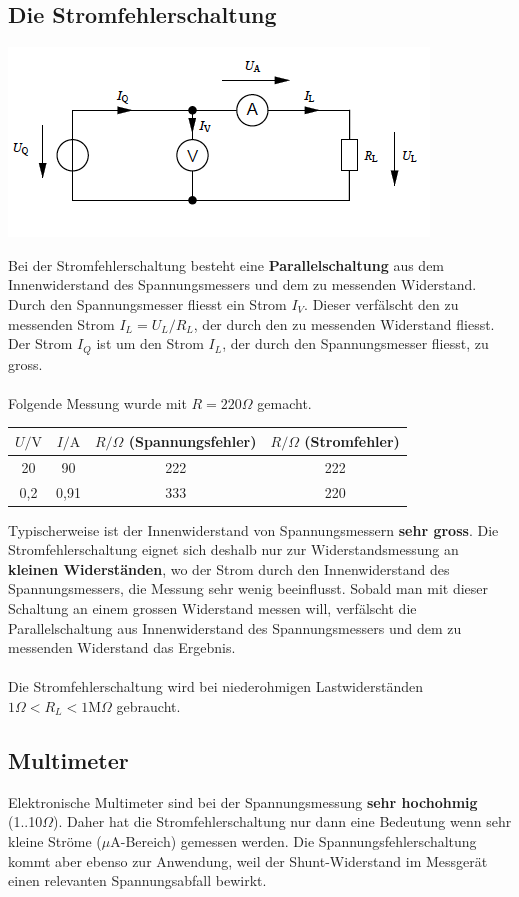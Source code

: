 \subsection{Die Stromfehlerschaltung}
\begin{center}
\includegraphics[scale=1]{../img/II/IIc}
\end{center}
Bei der Stromfehlerschaltung besteht eine \textbf{Parallelschaltung} aus dem Innenwiderstand des Spannungsmessers und dem zu messenden Widerstand. Durch den Spannungsmesser fliesst ein Strom $I_V$. Dieser verfälscht den zu messenden Strom $I_L=U_L/R_L$, der durch den zu messenden Widerstand fliesst. Der Strom $I_Q$ ist um den Strom $I_L$, der durch den Spannungsmesser fliesst, zu gross.
\\\\
Folgende Messung wurde mit $R=220\Omega$ gemacht.
\begin{center}
\begin{tabular}{cccc}\hline
$U/\text{V}$&$I/\text{A}$&$R/\Omega$ (Spannungsfehler)&$R/\Omega$ (Stromfehler)\\\hline
20&90&222&222\\
0,2&0,91&333&220\\\hline
\end{tabular}
\end{center}
Typischerweise ist der Innenwiderstand von Spannungsmessern \textbf{sehr gross}. Die Stromfehlerschaltung eignet sich deshalb nur zur Widerstandsmessung an \textbf{kleinen Widerständen}, wo der Strom durch den Innenwiderstand des Spannungsmessers, die Messung sehr wenig beeinflusst. Sobald man mit dieser Schaltung an einem grossen Widerstand messen will, verfälscht die Parallelschaltung aus Innenwiderstand des Spannungsmessers und dem zu messenden Widerstand das Ergebnis.
\\\\
Die Stromfehlerschaltung wird bei niederohmigen Lastwiderständen $\boxed{1\Omega<R_L<1\text{M}\Omega}$ gebraucht.
\subsection{Multimeter}
Elektronische Multimeter sind bei der Spannungsmessung \textbf{sehr hochohmig} (1..10$\Omega$). Daher hat die Stromfehlerschaltung nur dann eine Bedeutung wenn sehr kleine Ströme ($\mu$A-Bereich) gemessen werden. Die Spannungsfehlerschaltung kommt aber ebenso zur Anwendung, weil der Shunt-Widerstand im Messgerät einen relevanten Spannungsabfall bewirkt.
